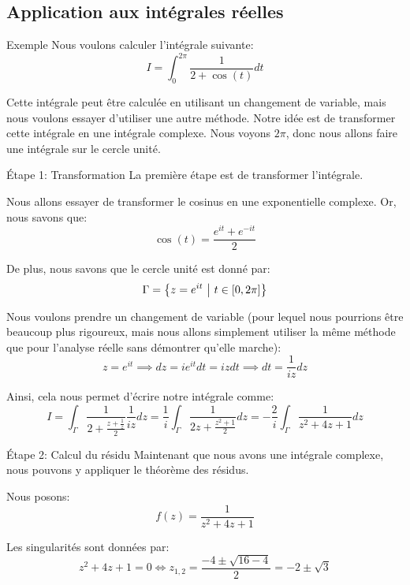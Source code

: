 \documentclass[a4paper]{article}
\begin{document}
\subsection{Application aux intégrales réelles}
\begin{parag}{Exemple}
    Nous voulons calculer l'intégrale suivante: 
    \[I = \int_{0}^{2\pi} \frac{1}{2 + \cos\left(t\right)}dt\]
    
    Cette intégrale peut être calculée en utilisant un changement de variable, mais nous voulons essayer d'utiliser une autre méthode. Notre idée est de transformer cette intégrale en une intégrale complexe. Nous voyons $2\pi$, donc nous allons faire une intégrale sur le cercle unité. 

    \begin{subparag}{Étape 1: Transformation}
        La première étape est de transformer l'intégrale.

        Nous allons essayer de transformer le cosinus en une exponentielle complexe. Or, nous savons que: 
        \[\cos\left(t\right) = \frac{e^{it} + e^{-it}}{2}\]
        
        De plus, nous savons que le cercle unité est donné par: 
        \[\Gamma = \left\{z = e^{it} \suchthat t \in \left[0, 2\pi\right]\right\}\]
        
        Nous voulons prendre un changement de variable (pour lequel nous pourrions être beaucoup plus rigoureux, mais nous allons simplement utiliser la même méthode que pour l'analyse réelle sans démontrer qu'elle marche): 
        \[z = e^{it} \implies dz = i e^{it} dt = izdt \implies dt = \frac{1}{iz}dz\]
        
        Ainsi, cela nous permet d'écrire notre intégrale comme: 
        \[I = \int_{\Gamma} \frac{1}{2 + \frac{z + \frac{1}{z}}{2}} \frac{1}{iz} dz = \frac{1}{i} \int_{\Gamma} \frac{1}{2z + \frac{z^2 + 1}{2}} dz = -\frac{2}{i} \int_{\Gamma} \frac{1}{z^2 + 4z + 1} dz\]
    \end{subparag}
    
    \begin{subparag}{Étape 2: Calcul du résidu}
        Maintenant que nous avons une intégrale complexe, nous pouvons y appliquer le théorème des résidus.

        Nous posons: 
        \[f\left(z\right) = \frac{1}{z^2 + 4z + 1}\]
        
        Les singularités sont données par: 
        \[z^2 + 4z + 1 = 0 \iff z_{1,2} = \frac{-4 \pm \sqrt{16 - 4}}{2} = -2 \pm \sqrt{3}\]


\end{subparag}
\end{parag}
\end{document}
